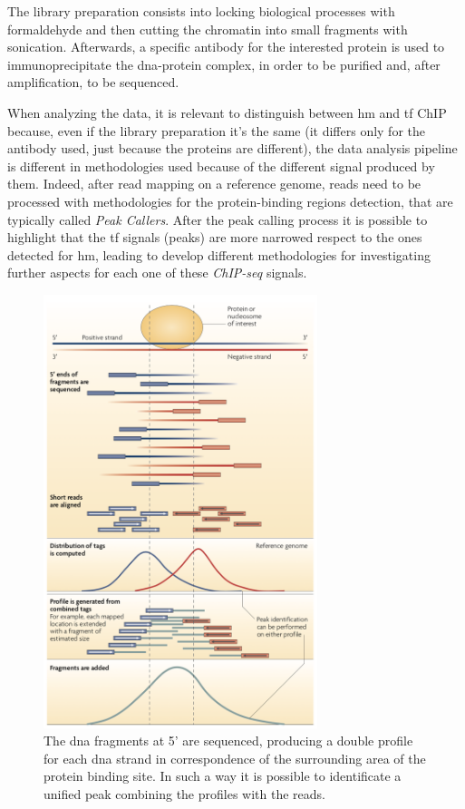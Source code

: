 The library preparation consists into locking biological processes with formaldehyde and then cutting the chromatin into small fragments with sonication.
Afterwards, a specific antibody for the interested protein is used to immunoprecipitate the \gls{dna}-protein complex, in order to be purified and, after amplification, to be sequenced.

When analyzing the data, it is relevant to distinguish between \gls{hm} and \gls{tf} ChIP because, even if the library preparation it's the same (it differs only for the antibody used, just because the proteins are different), the data analysis pipeline is different in methodologies used because of the different signal produced by them.
Indeed, after read mapping on a reference genome, reads need to be processed with methodologies for the protein-binding regions detection, that are typically called \textit{Peak Callers}.
After the peak calling process it is possible to highlight that the \gls{tf} signals (peaks) are more narrowed respect to the ones detected for \gls{hm}, leading to develop different methodologies for investigating further aspects for each one of these \textit{ChIP-seq} signals.

\begin{figure}[H]
\centering
\includegraphics[width=8cm, keepaspectratio]{img/intro/peak_call.png}
\caption[ChIP-seq peak detection]{The \gls{dna} fragments at 5' are sequenced, producing a double profile for each \gls{dna} strand in correspondence of the surrounding area of the protein binding site.
In such a way it is possible to identificate a unified peak combining the profiles with the reads.\cite{Park2009}}
\label{fig:chipseqexp}
\end{figure}

